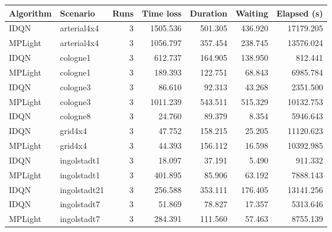 \begin{tabular}{llrrrrr}
\toprule
Algorithm & Scenario & Runs & Time loss & Duration & Waiting & Elapsed (s) \\
\midrule
IDQN & arterial4x4 & 3 & 1505.536 & 501.305 & 436.920 & 17179.205 \\
MPLight & arterial4x4 & 3 & 1056.797 & 357.454 & 238.745 & 13576.024 \\
IDQN & cologne1 & 3 & 612.737 & 164.905 & 138.950 & 812.441 \\
MPLight & cologne1 & 3 & 189.393 & 122.751 & 68.843 & 6985.784 \\
IDQN & cologne3 & 3 & 86.610 & 92.313 & 43.268 & 2351.500 \\
MPLight & cologne3 & 3 & 1011.239 & 543.511 & 515.329 & 10132.753 \\
IDQN & cologne8 & 3 & 24.760 & 89.379 & 8.354 & 5946.643 \\
IDQN & grid4x4 & 3 & 47.752 & 158.215 & 25.205 & 11120.623 \\
MPLight & grid4x4 & 3 & 44.393 & 156.112 & 16.598 & 10392.985 \\
IDQN & ingolstadt1 & 3 & 18.097 & 37.191 & 5.490 & 911.332 \\
MPLight & ingolstadt1 & 3 & 401.895 & 85.906 & 63.192 & 7888.143 \\
IDQN & ingolstadt21 & 3 & 256.588 & 353.111 & 176.405 & 13141.256 \\
IDQN & ingolstadt7 & 3 & 51.869 & 78.827 & 17.357 & 5313.646 \\
MPLight & ingolstadt7 & 3 & 284.391 & 111.560 & 57.463 & 8755.139 \\
\bottomrule
\end{tabular}
